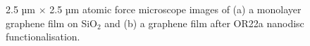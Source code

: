 \documentclass[
  a4paper,
]{scrbook}
\begin{document}
\begin{figure}
\begin{minipage}[t]{0.03\linewidth}
{

}

\end{minipage}%
%
\begin{minipage}[t]{0.01\linewidth}

{\centering 

~

}

\end{minipage}%
%
\begin{minipage}[t]{0.46\linewidth}

{\centering 


}

\end{minipage}%
%
\begin{minipage}[t]{0.01\linewidth}

{\centering 

~

}

\end{minipage}%

\caption{\label{fig-graphene-AFM-comparison}2.5 µm \(\times\) 2.5 µm
atomic force microscope images of (a) a monolayer graphene film on
SiO\(_2\) and (b) a graphene film after OR22a nanodisc
functionalisation.}

\end{figure}
\end{document}
